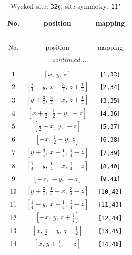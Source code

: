\documentclass[fleqn,8pt]{jsarticle}
\begin{document}
\renewcommand{\arraystretch}{1.2}
\begin{longtable}{ccc}
\caption{Wyckoff site: {\tt 32g}, site symmetry: {\tt 11'}}
 \\
 \hline \hline
No. & position & mapping \\ \hline \endfirsthead

\multicolumn{2}{l}{\tablename\ \thetable{}} \\
 \hline \hline
No. & position & mapping \\ \hline \endhead

 \hline \hline
\multicolumn{2}{r}{\footnotesize\it continued ...} \\ \endfoot

 \hline \hline
\multicolumn{2}{r}{} \\ \endlastfoot

1 & $\left[ x,\, y,\, z \right]$ & {\tt [1,33]} \\ \hline
2 & $\left[ \frac{1}{4} - y,\, x + \frac{3}{4},\, z + \frac{1}{4} \right]$ & {\tt [2,34]} \\ \hline
3 & $\left[ y + \frac{3}{4},\, \frac{3}{4} - x,\, z + \frac{1}{4} \right]$ & {\tt [3,35]} \\ \hline
4 & $\left[ x + \frac{1}{2},\, \frac{1}{2} - y,\, - z \right]$ & {\tt [4,36]} \\ \hline
5 & $\left[ \frac{1}{2} - x,\, y,\, - z \right]$ & {\tt [5,37]} \\ \hline
6 & $\left[ - x,\, \frac{1}{2} - y,\, z \right]$ & {\tt [6,38]} \\ \hline
7 & $\left[ y + \frac{3}{4},\, x + \frac{1}{4},\, \frac{1}{4} - z \right]$ & {\tt [7,39]} \\ \hline
8 & $\left[ \frac{1}{4} - y,\, \frac{1}{4} - x,\, \frac{1}{4} - z \right]$ & {\tt [8,40]} \\ \hline
9 & $\left[ - x,\, - y,\, - z \right]$ & {\tt [9,41]} \\ \hline
10 & $\left[ y + \frac{3}{4},\, \frac{1}{4} - x,\, \frac{3}{4} - z \right]$ & {\tt [10,42]} \\ \hline
11 & $\left[ \frac{1}{4} - y,\, x + \frac{1}{4},\, \frac{3}{4} - z \right]$ & {\tt [11,43]} \\ \hline
12 & $\left[ - x,\, y,\, z + \frac{1}{2} \right]$ & {\tt [12,44]} \\ \hline
13 & $\left[ x,\, \frac{1}{2} - y,\, z + \frac{1}{2} \right]$ & {\tt [13,45]} \\ \hline
14 & $\left[ x,\, y + \frac{1}{2},\, - z \right]$ & {\tt [14,46]} \\ \hline

\end{longtable}
\end{document}
